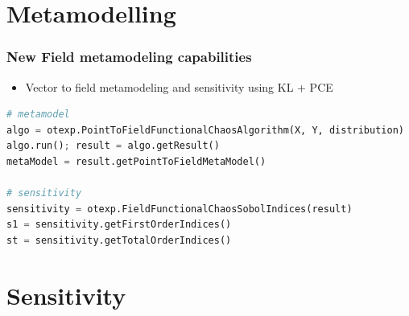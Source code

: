 \documentclass[aspectratio=169]{beamer}
\begin{document}

\section{Metamodelling}

\begin{frame}[containsverbatim]
\frametitle{New Field metamodeling capabilities}
\begin{itemize}
\item Vector to field metamodeling and sensitivity using KL + PCE
\end{itemize}


\begin{small}
\begin{lstlisting}[language=Python]
# metamodel
algo = otexp.PointToFieldFunctionalChaosAlgorithm(X, Y, distribution)
algo.run(); result = algo.getResult()
metaModel = result.getPointToFieldMetaModel()

# sensitivity
sensitivity = otexp.FieldFunctionalChaosSobolIndices(result)
s1 = sensitivity.getFirstOrderIndices()
st = sensitivity.getTotalOrderIndices()
\end{lstlisting}
\end{small}


\end{frame}




\section{Sensitivity}
\end{document}
